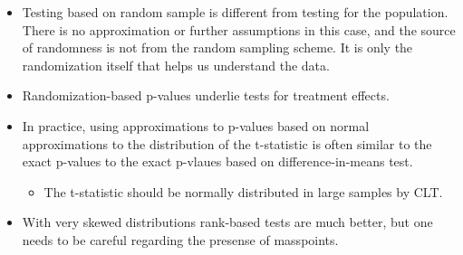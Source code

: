 \begin{itemize}
    \item {\color{blue} Testing based on random sample is different from testing for the population. There is no approximation or further assumptions in this case, and the source of randomness is not from the random sampling scheme. It is only the randomization itself that helps us understand the data.}    
    \item Randomization-based p-values underlie tests for treatment effects.
    \item In practice, using approximations to p-values based on normal approximations to the distribution of the t-statistic is often similar to the exact p-values to the exact p-vlaues based on difference-in-means test.
    \begin{itemize}
        \item[$\because$] The t-statistic should be normally distributed in large samples by CLT.
    \end{itemize}
    \item With very skewed distributions rank-based tests are much better, but one needs to be careful regarding the presense of masspoints.
\end{itemize}